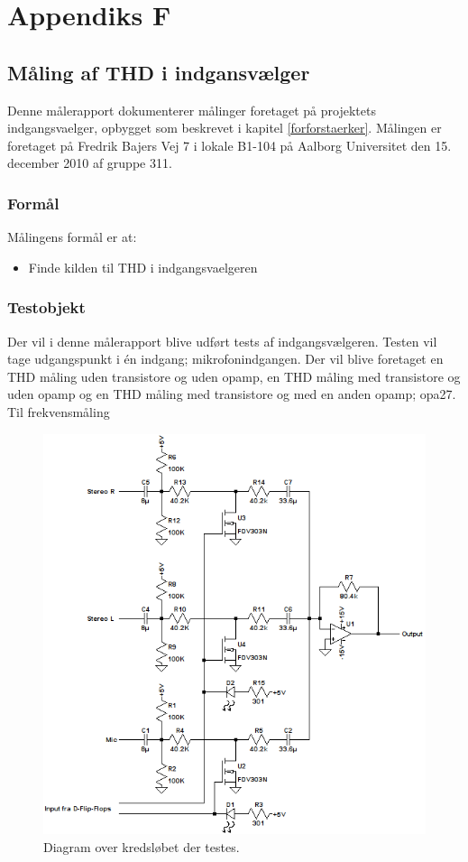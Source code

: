 %
%
\chapter{Appendiks F}
\label{maalejournal_indgangsvaelger_2}
\section*{Måling af THD i indgansvælger}
Denne målerapport dokumenterer målinger foretaget på projektets indgangsvaelger, opbygget som beskrevet i kapitel \ref{forforstaerker}. Målingen er foretaget på Fredrik Bajers Vej 7 i lokale B1-104 på Aalborg Universitet den 15. december 2010 af gruppe 311.

\subsection*{Formål}
Målingens formål er at:
\begin{itemize}
\item Finde kilden til THD i indgangsvaelgeren
\end{itemize}

\subsection*{Testobjekt}
Der vil i denne målerapport blive udført tests af indgangsvælgeren. Testen vil tage udgangspunkt i én indgang; mikrofonindgangen. Der vil blive foretaget en THD måling uden transistore og uden opamp, en THD måling med transistore og uden opamp og en THD måling med transistore og med en anden opamp; opa27.
Til frekvensmåling 
\begin{figure}[h]
\centering
\includegraphics[scale=0.8]{maalerapporter/indgangsvaelger/indgangvaelger_ltspice_diagram.png}
\caption{Diagram over kredsløbet der testes.}
\label{diagram_simulering}
\end{figure}

